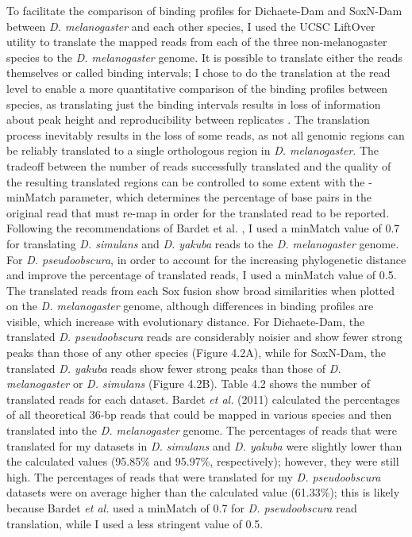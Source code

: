 To facilitate the comparison of binding profiles for Dichaete-Dam and SoxN-Dam between \emph{D. melanogaster} and each other species, I used the UCSC LiftOver utility to translate the mapped reads from each of the three non-melanogaster species to the \emph{D. melanogaster} genome. It is possible to translate either the reads themselves or called binding intervals; I chose to do the translation at the read level to enable a more quantitative comparison of the binding profiles between species, as translating just the binding intervals results in loss of information about peak height and reproducibility between replicates \citep{bardet_computational_2011}. The translation process inevitably results in the loss of some reads, as not all genomic regions can be reliably translated to a single orthologous region in \emph{D. melanogaster}. The tradeoff between the number of reads successfully translated and the quality of the resulting translated regions can be controlled to some extent with the -minMatch parameter, which determines the percentage of base pairs in the original read that must re-map in order for the translated read to be reported. Following the recommendations of Bardet et al. \citet{bardet_computational_2011}, I used a minMatch value of 0.7 for translating \emph{D. simulans} and \emph{D. yakuba} reads to the \emph{D. melanogaster} genome. For \emph{D. pseudoobscura}, in order to account for the increasing phylogenetic distance and improve the percentage of translated reads, I used a minMatch value of 0.5.\\

The translated reads from each Sox fusion show broad similarities when plotted on the \emph{D. melanogaster} genome, although differences in binding profiles are visible, which increase with evolutionary distance. For Dichaete-Dam, the translated \emph{D. pseudoobscura} reads are considerably noisier and show fewer strong peaks than those of any other species (Figure 4.2A), while for SoxN-Dam, the translated \emph{D. yakuba} reads show fewer strong peaks than those of \emph{D. melanogaster} or \emph{D. simulans} (Figure 4.2B). Table 4.2 shows the number of translated reads for each dataset. Bardet \emph{et al.} (2011) calculated the percentages of all theoretical 36-bp reads that could be mapped in various species and then translated into the \emph{D. melanogaster} genome. The percentages of reads that were translated for my datasets in \emph{D. simulans} and \emph{D. yakuba} were slightly lower than the calculated values (95.85\% and 95.97\%, respectively); however, they were still high. The percentages of reads that were translated for my \emph{D. pseudoobscura} datasets were on average higher than the calculated value (61.33\%); this is likely because Bardet \emph{et al.} used a minMatch of 0.7 for \emph{D. pseudoobscura} read translation, while I used a less stringent value of 0.5.\\

